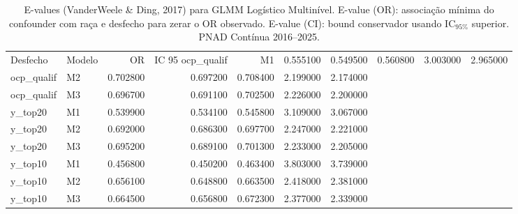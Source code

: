 \begin{table}
\caption{E-values (VanderWeele \& Ding, 2017) para GLMM Logístico Multinível. E-value (OR): associação mínima do confounder com raça e desfecho para zerar o OR observado. E-value (CI): bound conservador usando IC$_{95\%}$ superior. PNAD Contínua 2016--2025.}
\label{tab:evalues_glmm}
\begin{tabular}{llrrrrr}
\toprule
Desfecho & Modelo & OR & IC 95%
\midrule
ocp_qualif & M1 & 0.555100 & 0.549500 & 0.560800 & 3.003000 & 2.965000 \\
ocp_qualif & M2 & 0.702800 & 0.697200 & 0.708400 & 2.199000 & 2.174000 \\
ocp_qualif & M3 & 0.696700 & 0.691100 & 0.702500 & 2.226000 & 2.200000 \\
y_top20 & M1 & 0.539900 & 0.534100 & 0.545800 & 3.109000 & 3.067000 \\
y_top20 & M2 & 0.692000 & 0.686300 & 0.697700 & 2.247000 & 2.221000 \\
y_top20 & M3 & 0.695200 & 0.689100 & 0.701300 & 2.233000 & 2.205000 \\
y_top10 & M1 & 0.456800 & 0.450200 & 0.463400 & 3.803000 & 3.739000 \\
y_top10 & M2 & 0.656100 & 0.648800 & 0.663500 & 2.418000 & 2.381000 \\
y_top10 & M3 & 0.664500 & 0.656800 & 0.672300 & 2.377000 & 2.339000 \\
\bottomrule
\end{tabular}
\end{table}
